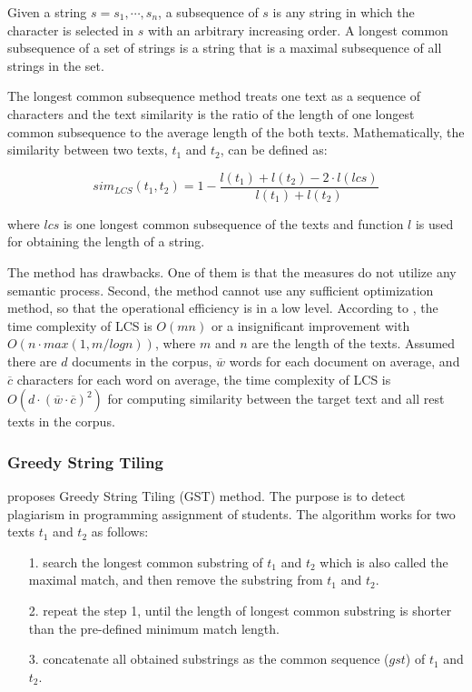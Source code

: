 Given a string $s = s_1, \cdots, s_n$, a subsequence of $s$ is any string in which the character is selected in $s$ with an arbitrary increasing order. A longest common subsequence of a set of strings is a string that is a maximal subsequence of all strings in the set. 

The longest common subsequence method treats one text as a sequence of characters and the text similarity is the ratio of the length of one longest common subsequence to the average length of the both texts. Mathematically, the similarity between two texts, $t_1$ and $t_2$, can be defined as: 

\begin{equation}
    sim_{LCS}(t_1, t_2) = 1 -  \frac{l(t_1) + l(t_2) - 2 \cdot l(lcs)}{l(t_1) + l(t_2)}
\end{equation}

where $lcs$ is one longest common subsequence of the texts and function $l$ is used for obtaining the length of a string. 

The method has drawbacks. One of them is that the measures do not utilize any semantic process. Second, the method cannot use any sufficient optimization method, so that the operational efficiency is in a low level. According to \cite{paterson1994longest}, the time complexity of LCS is $O(mn)$ or a insignificant improvement with $O(n\cdot max(1, m/log n))$, where $m$ and $n$ are the length of the texts. Assumed there are $d$ documents in the corpus, $\overline{w}$ words for each document on average, and $\overline{c}$ characters for each word on average, the time complexity of LCS is $O(d \cdot (\overline{w} \cdot \overline{c})^2)$ for computing similarity between the target text and all rest texts in the corpus.

\subsubsection{Greedy String Tiling}

\cite{wise1993string} proposes Greedy String Tiling (GST) method. The purpose is to detect plagiarism in programming assignment of students. The algorithm works for two texts $t_1$ and $t_2$ as follows:
\begin{itemize}
    \item[1.] search the longest common substring of $t_1$ and $t_2$ which is also called the maximal match, and then remove the substring from $t_1$ and $t_2$.
    \item[2.] repeat the step 1, until the length of longest common substring is shorter than the pre-defined minimum match length.
    \item[3.] concatenate all obtained substrings as the common sequence ($gst$) of $t_1$ and $t_2$. 
\end{itemize}

